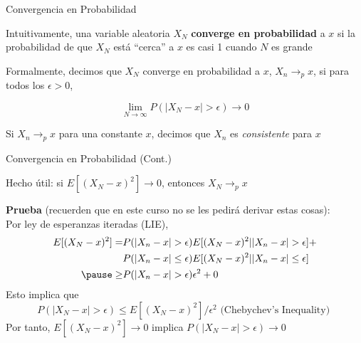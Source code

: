 \documentclass[11pt,handout,aspectratio=169]{beamer}
\newenvironment{wideitemize}{\itemize\addtolength{\itemsep}{10pt}}{\enditemize}
\begin{document}
\begin{frame}{Convergencia en Probabilidad}
	
\begin{wideitemize}
\item
Intuitivamente, una variable aleatoria $X_N$ \textbf{converge en probabilidad} a $x$ si la probabilidad de que $X_N$ está ``cerca'' a $x$ es casi 1 cuando $N$ es grande

\pause
\item
Formalmente, decimos que $X_N$ converge en probabilidad a $x$,  $X_n \rightarrow_p x$, si para todos los $\epsilon > 0$,

$$\lim_{N\rightarrow \infty}P(|X_N - x| > \epsilon) \rightarrow 0 $$

\pause
\item 
Si $X_n \rightarrow_p x$ para una constante $x$, decimos que $X_n$ es \textit{consistente} para $x$

	
\end{wideitemize}

\end{frame}


\begin{frame}{Convergencia en Probabilidad (Cont.)}
	
\begin{wideitemize}

\item Hecho útil: si $E[ (X_N - x)^2 ] \rightarrow 0$, entonces $X_N \rightarrow_p x$

\pause

\item 
\textbf{Prueba} (recuerden que en este curso no se les pedirá derivar estas cosas): \\

Por ley de esperanzas iteradas (LIE),
\begin{align*}
E[ (X_N - x)^2 ]=& P( |X_n - x| > \epsilon ) E[ (X_N - x)^2 | |X_n - x| > \epsilon ] + \\
& P( |X_n - x| \leq \epsilon ) E[ (X_N - x)^2 | |X_n - x| \leq \epsilon ]	 \\
\pause \geq &  P( |X_n - x| > \epsilon ) \epsilon^2 + 0 
\end{align*}
\pause
\noindent  Esto implica que 
$$P( |X_N - x|  > \epsilon ) \leq E[ (X_N - x)^2  ] / \epsilon^2 \text{ (Chebychev's Inequality)  }$$
\pause 
Por tanto, $E[ (X_N - x)^2  ] \rightarrow 0$ implica $P( |X_N - x|  > \epsilon ) \rightarrow 0$

\end{wideitemize}	
\end{frame}
\end{document}
